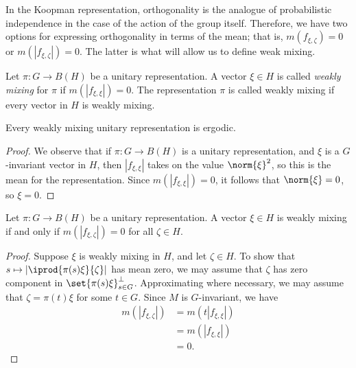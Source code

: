 \documentclass[10pt]{mypackage}
\begin{document}
In the Koopman representation, orthogonality is the analogue of probabilistic independence in the case of the action of the group itself. Therefore, we have two options for expressing orthogonality in terms of the mean; that is, $m\left( f_{\xi,\zeta} \right) = 0$ or $m\left( \left\vert f_{\xi,\zeta} \right\vert \right) = 0$. The latter is what will allow us to define weak mixing.
\begin{definition}
  Let $\pi\colon G\rightarrow B\left( H \right)$ be a unitary representation. A vector $\xi\in H$ is called \textit{weakly mixing} for $\pi$ if $m\left( \left\vert f_{\xi,\xi} \right\vert \right) = 0$. The representation $\pi$ is called weakly mixing if every vector in $H$ is weakly mixing.
\end{definition}
\begin{proposition}
  Every weakly mixing unitary representation is ergodic.
\end{proposition}
\begin{proof}
  We observe that if $\pi\colon G\rightarrow B\left( H \right)$ is a unitary representation, and $\xi$ is a $G$-invariant vector in $H$, then $\left\vert f_{\xi,\xi} \right\vert$ takes on the value $\norm{\xi}^2$, so this is the mean for the representation. Since $m\left( \left\vert f_{\xi,\xi} \right\vert \right) = 0$, it follows that $\norm{\xi} = 0$, so $\xi = 0$.
\end{proof}
\begin{lemma}
  Let $\pi\colon G\rightarrow B\left( H \right)$ be a unitary representation. A vector $\xi\in H$ is weakly mixing if and only if $m\left( \left\vert f_{\xi,\zeta} \right\vert \right) = 0$ for all $\zeta\in H$.
\end{lemma}
\begin{proof}
  Suppose $\xi$ is weakly mixing in $H$, and let $\zeta\in H$. To show that $s\mapsto \left\vert \iprod{\pi(s)\xi}{\zeta} \right\vert$ has mean zero, we may assume that $\zeta$ has zero component in $\set{\pi(s)\xi}_{s\in G}^{\perp}$. Approximating where necessary, we may assume that $\zeta = \pi(t)\xi$ for some $t\in G$. Since $M$ is $G$-invariant, we have
  \begin{align*}
    m\left( \left\vert f_{\xi,\zeta} \right\vert \right) &= m\left( t\left\vert f_{\xi,\xi} \right\vert \right)\\
                                                         &= m\left( \left\vert f_{\xi,\xi} \right\vert \right)\\
                                                         &= 0.
  \end{align*}
\end{proof}
\end{document}
